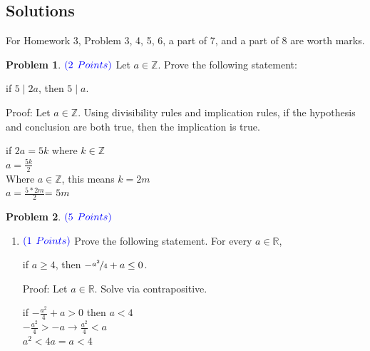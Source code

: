 \documentclass[letterpaper, 12pt]{article}
\newcommand{\hw}{3} %
\theoremstyle{definition}
\newtheorem{pb}{Problem} %
\begin{document}
\subsection*{Solutions}
For Homework \hw, Problem 3, 4, 5, 6, a part of 7, and a part of 8 are worth marks.
\begin{spacing}{1.33}


\vspace{5mm}
\setcounter{pb}{2}
\begin{pb} 


    $\color{blue}{(2}$ $\color{blue}{Points)}$ Let $a \in \mathbb{Z}$. Prove the following statement:
    \begin{center}
        if $5 \mid 2a$, then $5 \mid a$.
    \end{center}  
    


    Proof: Let $a \in \mathbb{Z}$. Using divisibility rules and implication rules, if the hypothesis and conclusion are both true, then the implication is true.
    \begin{center}
        if $2a = 5k$ where $k \in \mathbb{Z}$\\
        $a = \frac{5k}{2}$\\
        Where $a \in \mathbb{Z} $, this means $k = 2m$\\
        $a = \frac{5 * 2m}{2}$= $5m$
        
    \end{center}



\end{pb}




\vspace{20cm}
\begin{pb} 
    $\color{blue}{(5}$ $\color{blue}{Points)}$
    \begin{enumerate}

        \item[1.] $\color{blue}{(1}$ $\color{blue}{Points)}$ Prove the following statement. For every   $a \in \mathbb{R}$,
        \begin{center}
            if $a \geq 4$, then $-\nicefrac{a^2}{4} + a \leq 0$.
        \end{center}
    
        Proof: Let $a \in \mathbb{R}$. Solve via contrapositive.
        \begin{center}
            if $-\frac{a^2}{4} + a > 0$ then $a < 4$\\
            $-\frac{a^2}{4} > -a \longrightarrow \frac{a^2}{4} < a$\\
            $a^2 < 4a = a < 4$
        \end{center}
    

\end{enumerate}
\end{pb}
\end{spacing}
\end{document}
